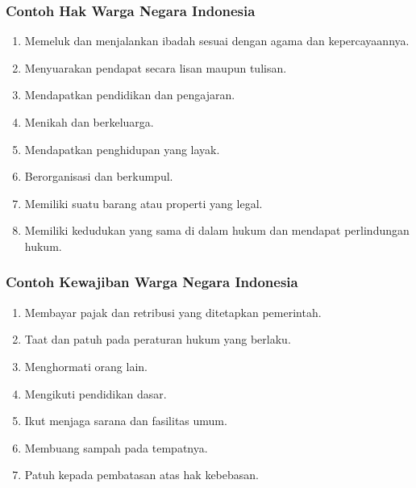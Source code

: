 \subsubsection{Contoh Hak Warga Negara Indonesia}
\begin{enumerate}
    \item Memeluk dan menjalankan ibadah sesuai dengan agama dan kepercayaannya.
    \item Menyuarakan pendapat secara lisan maupun tulisan.
    \item Mendapatkan pendidikan dan pengajaran.
    \item Menikah dan berkeluarga.
    \item Mendapatkan penghidupan yang layak.
    \item Berorganisasi dan berkumpul.
    \item Memiliki suatu barang atau properti yang legal.
    \item Memiliki kedudukan yang sama di dalam hukum dan mendapat perlindungan hukum.
\end{enumerate}

\subsubsection{Contoh Kewajiban Warga Negara Indonesia}
\begin{enumerate}
    \item Membayar pajak dan retribusi yang ditetapkan pemerintah.
    \item Taat dan patuh pada peraturan hukum yang berlaku.
    \item Menghormati orang lain.
    \item Mengikuti pendidikan dasar.
    \item Ikut menjaga sarana dan fasilitas umum.
    \item Membuang sampah pada tempatnya.
    \item Patuh kepada pembatasan atas hak kebebasan.
\end{enumerate}